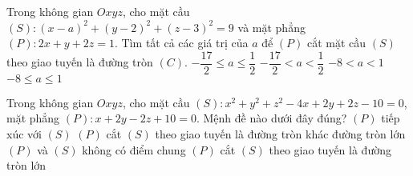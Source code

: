 \begin{ex}%
	Trong không gian $Oxyz$, cho mặt cầu $(S)\colon(x-a)^2+(y-2)^2+(z-3)^2=9$ và mặt phẳng $(P)\colon 2x+y+2z=1$. Tìm tất cả các giá trị của $a$ để $(P)$ cắt mặt cầu $(S)$ theo giao tuyến là đường tròn $(C)$.
	\choice
	{$-\dfrac{17}{2}\leq a\leq \dfrac{1}{2}$}
	{$-\dfrac{17}{2}<a<\dfrac{1}{2}$}
	{\True $-8<a<1$}
	{$-8\leq a\leq 1$}
\end{ex}

\begin{ex}%
	Trong không gian $Oxyz$, cho mặt cầu $(S)\colon x^2+y^2+z^2-4 x+2 y+2 z-10=0$, mặt phẳng $(P)\colon x+2 y-2 z+10=0$. Mệnh đề nào dưới đây đúng?
	\choice
	{\True $(P)$ tiếp xúc với $(S)$}
	{$(P)$ cắt $(S)$ theo giao tuyến là đường tròn khác đường tròn lớn}
	{$(P)$ và $(S)$ không có điểm chung}
	{$(P)$ cắt $(S)$ theo giao tuyến là đường tròn lớn}
\end{ex}

